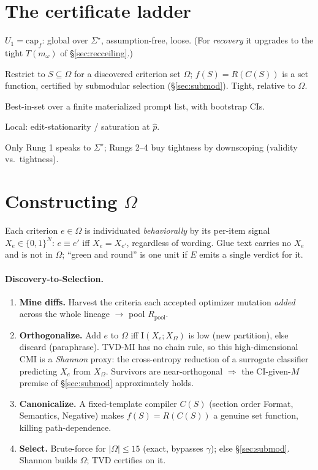 \documentclass[11pt]{article}
\newcommand{\Iv}{\mathrm{I}}
\newcommand{\Om}{\Omega}
\newcommand{\Mw}{m_\omega}
\begin{document}
\section{The certificate ladder}\label{sec:ladder}
\begin{description}[leftmargin=1.3em,itemsep=1pt]
\item[Rung 1.] $U_1=\mathrm{cap}_f$: global over $\Sigma^\star$, assumption-free, loose. (For \emph{recovery}
it upgrades to the tight $T(\Mw)$ of \S\ref{sec:recceiling}.)
\item[Rung 2.] Restrict to $S\subseteq\Om$ for a discovered criterion set $\Om$; $f(S)=R(C(S))$ is a set
function, certified by submodular selection (\S\ref{sec:submod}). Tight, relative to $\Om$.
\item[Rung 3.] Best-in-set over a finite materialized prompt list, with bootstrap CIs.
\item[Rung 4.] Local: edit-stationarity / saturation at $\hat p$.
\end{description}
Only Rung 1 speaks to $\Sigma^\star$; Rungs 2--4 buy tightness by downscoping (validity vs.\ tightness).

\section{Constructing $\Om$}\label{sec:omega}
Each criterion $e\in\Om$ is individuated \emph{behaviorally} by its per-item signal $X_e\in\{0,1\}^N$:
$e\equiv e'$ iff $X_e=X_{e'}$, regardless of wording. Glue text carries no $X_e$ and is not in $\Om$;
``green and round'' is one unit if $E$ emits a single verdict for it.

\paragraph{Discovery-to-Selection.}
\begin{enumerate}[leftmargin=1.5em,itemsep=1pt]
\item \textbf{Mine diffs.} Harvest the criteria each accepted optimizer mutation \emph{added} across the
whole lineage $\to$ pool $R_{\mathrm{pool}}$.
\item \textbf{Orthogonalize.} Add $e$ to $\Om$ iff $\Iv(X_e;X_\Om)$ is low (new partition), else discard
(paraphrase). TVD-MI has no chain rule, so this high-dimensional CMI is a \emph{Shannon} proxy: the
cross-entropy reduction of a surrogate classifier predicting $X_e$ from $X_\Om$. Survivors are
near-orthogonal $\Rightarrow$ the CI-given-$M$ premise of \S\ref{sec:submod} approximately holds.
\item \textbf{Canonicalize.} A fixed-template compiler $C(S)$ (section order Format, Semantics, Negative)
makes $f(S)=R(C(S))$ a genuine set function, killing path-dependence.
\item \textbf{Select.} Brute-force for $|\Om|\le15$ (exact, bypasses $\gamma$); else \S\ref{sec:submod}.
Shannon builds $\Om$; TVD certifies on it.
\end{enumerate}
\end{document}
